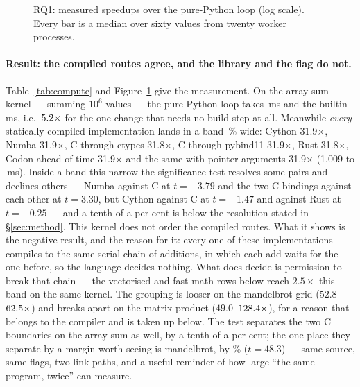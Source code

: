 \begin{figure}[t]
  \centering
  \caption{RQ1: measured speedups over the pure-Python loop (log scale). Every bar is a
    median over sixty  values from twenty worker processes.}
  \label{fig:compute}
\end{figure}

\paragraph{Result: the compiled routes agree, and the library and the flag do not.}
Table~\ref{tab:compute} and Figure~\ref{fig:compute} give the measurement. On the array-sum
kernel --- summing $10^6$  values --- the pure-Python loop takes
\,ms and the builtin  \,ms, i.e.\ $\meas{ratio:b1_compute-314:arraysum/cpython_loop|b1_compute-314:arraysum/cpython_builtin_sum}{5.2}\times$ for the one change that needs no
build step at all. Meanwhile \emph{every} statically compiled implementation lands in a band
\,\% wide:
Cython 31.9$\times$, Numba 31.9$\times$, C through ctypes 31.8$\times$, C through pybind11
31.9$\times$, Rust 31.8$\times$, Codon ahead of time 31.9$\times$ and the same with pointer
arguments 31.9$\times$ (1.009 to \,ms). Inside a band this narrow the significance
test resolves some pairs and declines others --- Numba against C at $t=-3.79$ and the two C
bindings against each other at $t=3.30$, but Cython against C at $t=-1.47$ and against Rust at
$t=-0.25$ --- and a tenth of a per cent is below the resolution stated in
\S\ref{sec:method}. This kernel does not order the compiled routes. What it shows is the
negative result, and the reason for it: every one of these implementations
compiles to the same serial chain of additions, in which each add waits for the one before, so
the language decides nothing. What does decide is permission to break that chain --- the
vectorised and fast-math rows below reach $2.5\times$ this band on the same kernel. The
grouping is looser on the mandelbrot grid ($52.8$--$\meas{ratio:b1_compute-314:mandelbrot/cpython_loop|b1_compute-314:mandelbrot/cython}{62.5}\times$)
and breaks apart on the matrix product ($49.0$--$\meas{ratio:b1_compute-314:matmul/cpython_loop|b1_compute-314:matmul/numba}{128.4}\times$), for a reason that belongs to the
compiler and is taken up below. The test separates the two C boundaries on the array sum as
well, by a tenth of a per cent; the one place they separate by a margin worth seeing is
mandelbrot, by \% ($t=48.3$) --- same source, same flags, two link paths, and a
useful reminder of how large ``the same program, twice'' can measure.

